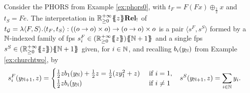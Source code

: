 \begin{example}\label{ex:phors2}
Consider the PHORS from Example \ref{ex:phors0}, with $t_F=F(Fx)\oplus_{\frac{1}{2}}x$ and $t_S=Fe$.
%
The interpretation in ${\mathbb{R}^{+\infty}_{\geq 0}}\{\!\!\{z\}\!\!\}\mathbf{Rel_!}$ 
 of $t_{\mathcal{G}}=\lambda \langle F,S\rangle. \langle t_F,t_S\rangle:((o\to o)\times o)\to (o\to o)\times o$ 
 is a pair $\langle s^F, s^S\rangle$ formed by a $\mathbb{N}$-indexed family of fps 
$s^F_i\in \fps{(\fps{\Rinf}{z})}{\N +1}$ and a single fps 
$s^S\in \fps{(\fps{\Rinf}{z})}{\N +1}$ given, for $i\in \mathbb{N}$, and recalling $b_i(y_{\mathbb{N}})$ from Example \ref{ex:churchtwo}, by
\begin{align*}
s^F_i(y_{\mathbb{N}+1},z)&=
\begin{cases}
\frac{1}{2}zb_1(y_{\mathbb{N}})+\frac{1}{2}z=\frac{1}{2}(z
y_1^2+z)
& \text{ if }i=1,\\
\frac{1}{2}zb_i(y_{\mathbb{N}})
&\text{ if }i\neq 1
\end{cases}
&
s^S(y_{\mathbb{N} +1},z)&=\sum_{i\in \mathbb{N}} y_i.
\end{align*}
 

\end{example}
